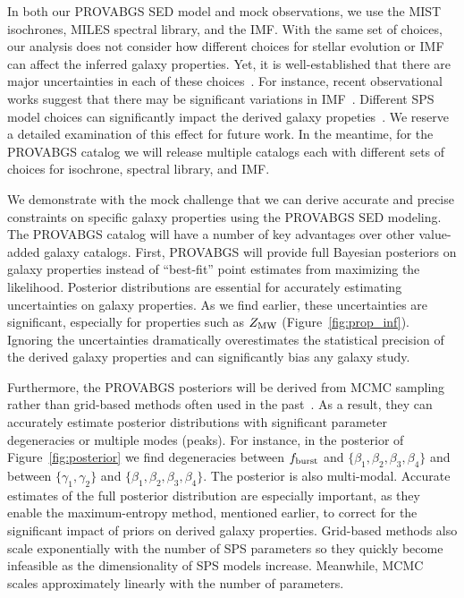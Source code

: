 In both our {\sc PROVABGS} SED model and mock observations, we use the MIST
isochrones, MILES spectral library, and the \cite{chabrier2003} IMF.
With the same set of choices, our analysis does not consider how different
choices for stellar evolution or IMF can affect the inferred galaxy properties. 
Yet, it is well-established that there are major uncertainties in each of these
choices~\citep{conroy2009, conroy2013}.
For instance, recent observational works suggest that there may be significant
variations in IMF~\citep[\emph{e.g.}][]{treu2010, vandokkum2010, rosani2018,
sonnenfeld2019}. 
Different SPS model choices can significantly impact the derived galaxy
propeties~\citep[\emph{e.g.}][]{ge2019}.
We reserve a detailed examination of this effect for future work. 
In the meantime, for the {\sc PROVABGS} catalog we will release multiple
catalogs each with different sets of choices for isochrone, spectral library,
and IMF.

We demonstrate with the mock challenge that we can derive accurate and precise
constraints on specific galaxy properties using the {\sc PROVABGS} SED modeling.
The {\sc PROVABGS} catalog will have a number of key advantages over other
value-added galaxy catalogs. 
First, {\sc PROVABGS} will provide full Bayesian posteriors on galaxy
properties instead of ``best-fit'' point estimates from maximizing the
likelihood. 
Posterior distributions are essential for accurately estimating uncertainties
on galaxy properties.  
As we find earlier, these uncertainties are significant, especially for
properties such as $Z_{\rm MW}$ (Figure~\ref{fig:prop_inf}). 
Ignoring the uncertainties dramatically overestimates the statistical precision
of the derived galaxy properties and can significantly bias any galaxy study.

Furthermore, the {\sc PROVABGS} posteriors will be derived from MCMC sampling
rather than grid-based methods often used in the
past~\citep[\emph{e.g.}][]{dacunha2008, moustakas2013, boquien2019}.
As a result, they can accurately estimate posterior distributions with
significant parameter degeneracies or multiple modes (peaks). 
For instance, in the posterior of Figure~\ref{fig:posterior} we find
degeneracies between $f_{\rm burst}$ and $\{\beta_1, \beta_2, \beta_3,
\beta_4\}$ and between $\{\gamma_1, \gamma_2\}$ and $\{\beta_1, \beta_2,
\beta_3, \beta_4\}$. 
The posterior is also multi-modal. 
Accurate estimates of the full posterior distribution are especially important,
as they enable the maximum-entropy method, mentioned earlier, 
to correct for the significant impact of priors on derived galaxy properties.
Grid-based methods also scale exponentially with the number of SPS parameters
so they quickly become infeasible as the dimensionality of SPS models increase. 
Meanwhile, MCMC scales approximately linearly with the number of parameters. 


